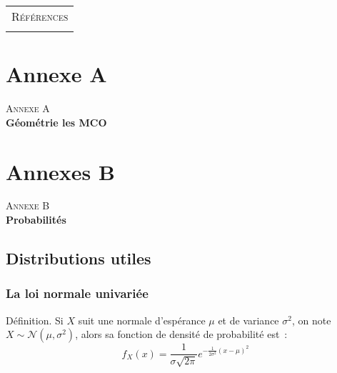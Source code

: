 \documentclass[10pt]{beamer}
\theoremstyle{plain}
\newenvironment{defn}[1]
{\bgroup \small\begin{block}{Définition. #1}}
  {\end{block}\egroup}
\begin{document}
\begin{notes}

  \begin{center}
    \begin{tabular}{c}
      \\
      \Huge{\textsc{Références}}\\
      \\
    \end{tabular}
  \end{center}

  \bigskip

  \printbibliography

\end{notes}



\section{Annexe A}

\begin{frame}
  \begin{center}
    \Huge{\textsc{Annexe A}}\\
    \Huge\textbf{Géométrie les MCO}
  \end{center}
\end{frame}


\section{Annexes B}

\begin{frame}
  \begin{center}
    \Huge{\textsc{Annexe B}}\\
    \Huge\textbf{Probabilités}
  \end{center}
\end{frame}

\subsection{Distributions utiles}

\begin{frame}
  \frametitle{La loi normale univariée}

  \begin{defn}{}
    Si $X$ suit une normale d'espérance $\mu$ et de variance $\sigma^2$, on note $X\sim\mathcal N \left(\mu, \sigma^2\right)$, alors sa fonction de densité de probabilité est~:
    \[
      f_X(x) = \frac{1}{\sigma\sqrt{2\pi}}e^{-\frac{1}{2\sigma^2}\left(x-\mu\right)^2}
    \]
  \end{defn}

\end{frame}
\end{document}
